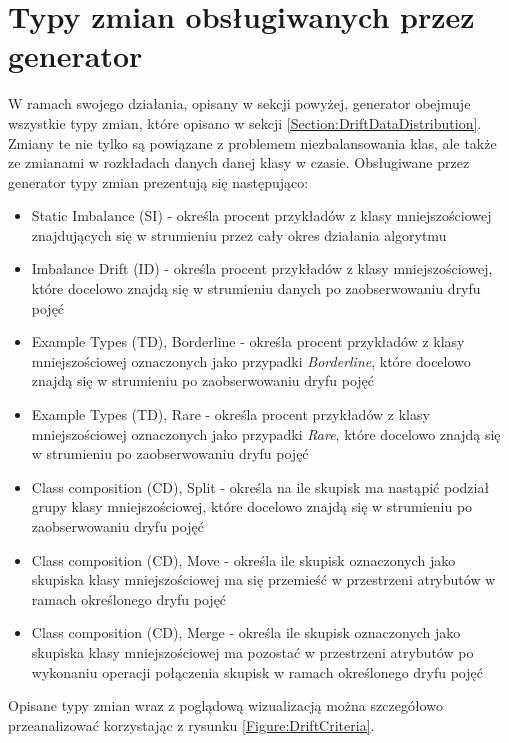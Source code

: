 \section{Typy zmian obsługiwanych przez generator}

\noindent W ramach swojego działania, opisany w sekcji powyżej, generator obejmuje wszystkie typy zmian, które opisano w sekcji \ref{Section:DriftDataDistribution}. Zmiany te nie tylko są powiązane z problemem niezbalansowania klas, ale także ze zmianami w rozkładach danych danej klasy w czasie. Obsługiwane przez generator typy zmian prezentują się następująco:

\begin{itemize}
    \item Static Imbalance (SI) - określa procent przykładów z klasy mniejszościowej znajdujących się w strumieniu przez cały okres działania algorytmu
    \item Imbalance Drift (ID) - określa procent przykładów z klasy mniejszościowej, które docelowo znajdą się w strumieniu danych po zaobserwowaniu dryfu pojęć
    \item Example Types (TD), Borderline - określa procent przykładów z klasy mniejszościowej oznaczonych jako przypadki \textit{Borderline}, które docelowo znajdą się w strumieniu po zaobserwowaniu dryfu pojęć
    \item Example Types (TD), Rare - określa procent przykładów z klasy mniejszościowej oznaczonych jako przypadki \textit{Rare}, które docelowo znajdą się w strumieniu po zaobserwowaniu dryfu pojęć
    \item Class composition (CD), Split - określa na ile skupisk ma nastąpić podział grupy klasy mniejszościowej, które docelowo znajdą się w strumieniu po zaobserwowaniu dryfu pojęć
    \item Class composition (CD), Move - określa ile skupisk oznaczonych jako skupiska klasy mniejszościowej ma się przemieść w przestrzeni atrybutów w ramach określonego dryfu pojęć
    \item Class composition (CD), Merge - określa ile skupisk oznaczonych jako skupiska klasy mniejszościowej ma pozostać w przestrzeni atrybutów po wykonaniu operacji połączenia skupisk w ramach określonego dryfu pojęć
\end{itemize}

\newpage

\noindent Opisane typy zmian wraz z poglądową wizualizacją można szczegółowo przeanalizować korzystając z rysunku \ref{Figure:DriftCriteria}.

